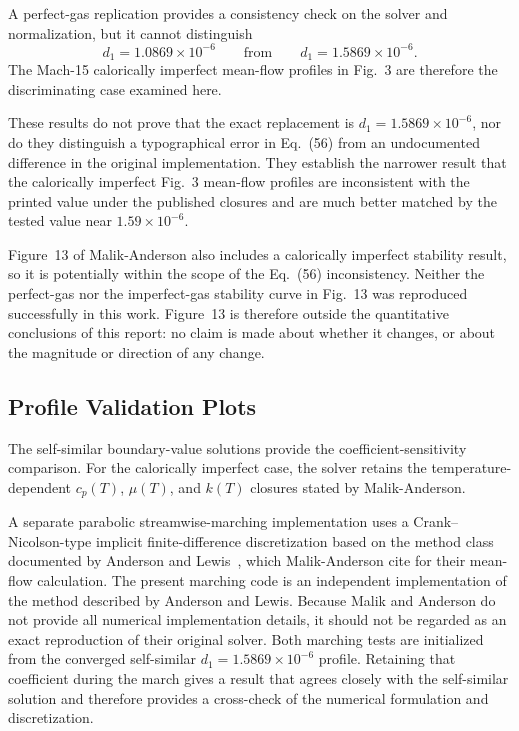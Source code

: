 \documentclass[11pt]{article}
\newcommand{\MA}{Malik-Anderson}
\newcommand{\note}[2]{%
  \vspace{0.3em}%
  \noindent\colorbox{#1}{%
    \begin{minipage}{0.965\linewidth}
      #2
    \end{minipage}}%
  \vspace{0.3em}%
}
\begin{document}
A perfect-gas replication provides a consistency check on the solver and normalization, but it cannot distinguish
\[
  d_1 = 1.0869\times10^{-6}
  \qquad\text{from}\qquad
  d_1 = 1.5869\times10^{-6}.
\]
The Mach-15 calorically imperfect mean-flow profiles in Fig.~3 are therefore the discriminating case examined here.

These results do not prove that the exact replacement is \(d_1=1.5869\times10^{-6}\), nor do they distinguish a typographical error in Eq.~(56) from an undocumented difference in the original implementation. They establish the narrower result that the calorically imperfect Fig.~3 mean-flow profiles are inconsistent with the printed value under the published closures and are much better matched by the tested value near \(1.59\times10^{-6}\).

\note{HypLightBlue}{Figure~13 of \MA{} also includes a calorically imperfect stability result, so it is potentially within the scope of the Eq.~(56) inconsistency. Neither the perfect-gas nor the imperfect-gas stability curve in Fig.~13 was reproduced successfully in this work. Figure~13 is therefore outside the quantitative conclusions of this report: no claim is made about whether it changes, or about the magnitude or direction of any change.}

\subsection{Profile Validation Plots}
\label{sec:profile_validation_plots}

The self-similar boundary-value solutions provide the coefficient-sensitivity comparison. For the calorically imperfect case, the solver retains the temperature-dependent \(c_p(T)\), \(\mu(T)\), and \(k(T)\) closures stated by \MA{}.

A separate parabolic streamwise-marching implementation uses a Crank--Nicolson-type implicit finite-difference discretization based on the method class documented by Anderson and Lewis~\cite{andersonlewis1971}, which \MA{} cite for their mean-flow calculation. The present marching code is an independent implementation of the method described by Anderson and Lewis. Because Malik and Anderson do not provide all numerical implementation details, it should not be regarded as an exact reproduction of their original solver. Both marching tests are initialized from the converged self-similar \(d_1=1.5869\times10^{-6}\) profile. Retaining that coefficient during the march gives a result that agrees closely with the self-similar solution and therefore provides a cross-check of the numerical formulation and discretization.
\end{document}
